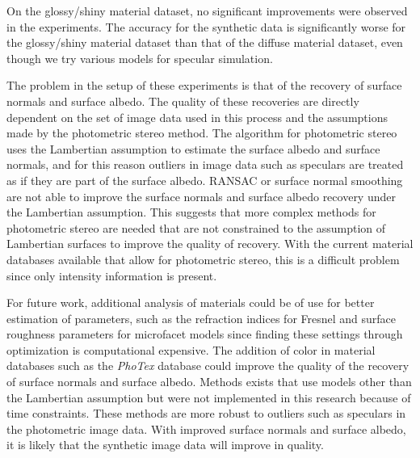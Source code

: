 On the glossy/shiny material dataset, no significant improvements were observed in the experiments. The accuracy for the synthetic data is significantly worse for the glossy/shiny material dataset than that of the diffuse material dataset, even though we try various models for specular simulation.

The problem in the setup of these experiments is that of the recovery of surface normals and surface albedo. The quality of these recoveries are directly dependent on the set of image data used in this process and the assumptions made by the photometric stereo method. The algorithm for photometric stereo uses the Lambertian assumption to estimate the surface albedo and surface normals, and for this reason outliers in image data such as speculars are treated as if they are part of the surface albedo. RANSAC or surface normal smoothing are not able to improve the surface normals and surface albedo recovery under the Lambertian assumption. This suggests that more complex methods for photometric stereo are needed that are not constrained to the assumption of Lambertian surfaces to improve the quality of recovery. With the current material databases available that allow for photometric stereo, this is a difficult problem since only intensity information is present. 

For future work, additional analysis of materials could be of use for better estimation of parameters, such as the refraction indices for Fresnel and surface roughness parameters for microfacet models since finding these settings through optimization is computational expensive. The addition of color in material databases such as the {\it PhoTex} database could improve the quality of the recovery of surface normals and surface albedo. Methods exists that use models other than the Lambertian assumption but were not implemented in this research because of time constraints. These methods are more robust to outliers such as speculars in the photometric image data. With improved surface normals and surface albedo, it is likely that the synthetic image data will improve in quality.
